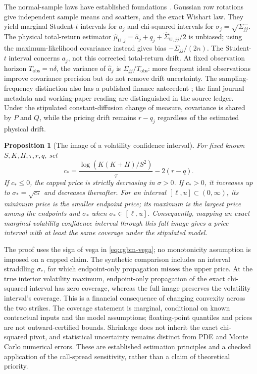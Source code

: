 \documentclass[11pt]{article}
\newtheorem{proposition}[theorem]{Proposition}
\begin{document}
The normal-sample laws have established foundations \citep{student1908,wishart1928}.
Gaussian row rotations give independent sample means and scatters, and
the exact Wishart law. They yield marginal Student-$t$ intervals for
$a_j$ and chi-squared intervals for $\sigma_j=\sqrt{\Sigma_{jj}}$.
The physical total-return estimator
$\widehat\mu_{\mathrm U,j}=\widehat a_j+q_j+
\widehat\Sigma_{\mathrm U,jj}/2$ is unbiased;
using the maximum-likelihood covariance instead gives bias
$-\Sigma_{jj}/(2n)$. The Student-$t$ interval concerns $a_j$, not
this corrected total-return drift. At fixed observation horizon
$T_{\mathrm{obs}}=n\delta$, the variance of $\widehat a_j$ is
$\Sigma_{jj}/T_{\mathrm{obs}}$: more frequent ideal observations
improve covariance precision but do not remove drift uncertainty.
The sampling-frequency distinction also has a published finance antecedent
\citep{merton1980}; the final journal metadata and working-paper reading
are distinguished in the source ledger.
Under the stipulated constant-diffusion change of measure,
covariance is shared by $P$ and $Q$, while the pricing drift remains
$r-q_j$ regardless of the estimated physical drift.

\begin{proposition}[The image of a volatility confidence interval]
\label{prop:cgbm-volatility-image}
For fixed known $S,K,H,\tau,r,q$, set
\begin{equation}
 c_* =\frac{\log(K(K+H)/S^2)}{\tau}-2(r-q).
 \label{eq:cgbm-volatility-critical}
\end{equation}
If $c_*\leq0$, the capped price is strictly decreasing in $\sigma>0$.
If $c_*>0$, it increases up to $\sigma_* =\sqrt{c_*}$ and decreases
thereafter. For an interval $[\ell,u]\subset(0,\infty)$, its minimum
price is the smaller endpoint price; its maximum is the largest price
among the endpoints and $\sigma_*$ when $\sigma_*\in[\ell,u]$.
Consequently, mapping an exact marginal volatility confidence interval
through this full image gives a price interval with at least the same
coverage under the stipulated model.
\end{proposition}

The proof uses the sign of vega in \eqref{eq:cgbm-vega}; no monotonicity
assumption is imposed on a capped claim. The synthetic comparison includes
an interval straddling $\sigma_*$, for which endpoint-only propagation
misses the upper price. At the true interior volatility maximum, endpoint-only propagation
of the exact chi-squared interval has zero coverage, whereas the full image
preserves the volatility interval's coverage. This is a financial consequence of changing
convexity across the two strikes. The coverage statement is marginal,
conditional on known contractual inputs and the model assumptions;
floating-point quantiles and prices are not outward-certified bounds.
Shrinkage does not inherit the exact chi-squared pivot, and statistical
uncertainty remains distinct from PDE and Monte Carlo numerical errors.
These are established estimation principles and a checked application
of the call-spread sensitivity, rather than a claim of theoretical priority.
\end{document}
